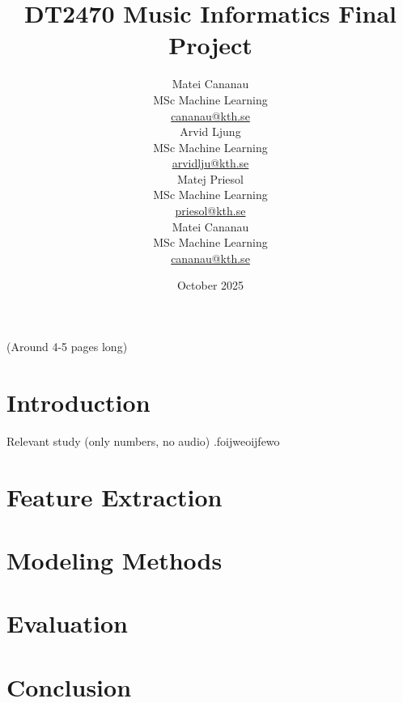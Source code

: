 \documentclass{article}
\title{DT2470 Music Informatics Final Project}
\date{October 2025}
\author{
    \begin{minipage}[t]{0.24\textwidth}
        \centering
        Matei Cananau \\
        MSc Machine Learning \\
        \href{mailto:cananau@kth.se}{cananau@kth.se}
    \end{minipage}
    \hfill
    \begin{minipage}[t]{0.24\textwidth}
        \centering
        Arvid Ljung \\
        MSc Machine Learning \\
        \href{mailto:arvidlju@kth.se}{arvidlju@kth.se}
    \end{minipage}
    \hfill
    \begin{minipage}[t]{0.24\textwidth}
        \centering
        Matej Priesol \\
        MSc Machine Learning \\
        \href{mailto:priesol@kth.se}{priesol@kth.se}
    \end{minipage}
    \hfill
    \begin{minipage}[t]{0.24\textwidth}
        \centering
        Matei Cananau \\
        MSc Machine Learning \\
        \href{mailto:cananau@kth.se}{cananau@kth.se}
    \end{minipage}
}
\begin{document}
\maketitle

\tableofcontents

(Around 4-5 pages long)


\newpage

\section{Introduction}

Relevant study (only numbers, no audio) \cite{medley2k2020}.foijweoijfewo

\section{Feature Extraction}

\section{Modeling Methods}
\cite{vandeveire2018automateddj}

\section{Evaluation}

\section{Conclusion}



\end{document}
